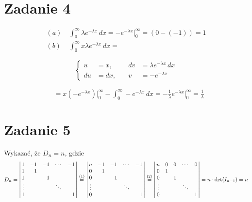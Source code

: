 \documentclass[11pt]{article}
\begin{document}
\section*{Zadanie 4}
\begin{align*}
(a)\;& \int_{0}^{\infty}\lambda e^{-\lambda x}\,dx= -e^{-\lambda x}\Big|_{0}^{\infty}=(0-(-1))=1 \\
(b)\;& \int_{0}^{\infty}x \lambda e^{-\lambda x}\,dx=
\end{align*}

\[\left\{
\begin{aligned}
u &= x, \quad &dv& = \lambda e^{-\lambda x}\,dx\\
du &= dx, \quad &v& = -e^{-\lambda x}
\end{aligned}
\right.\]

\begin{align*}
&= x (-e^{-\lambda x})\Big|_{0}^{\infty}-\int_{0}^{\infty} -e^{-\lambda x}\,dx=-\frac{1}{\lambda}e^{-\lambda x}\Big|_{0}^{\infty}=\frac{1}{\lambda}
\end{align*}

\section*{Zadanie 5}
Wykazać, że $D_n = n$, gdzie
\[
  D_n = 
\left|\,
\begin{matrix}
1      & -1 & -1 & \cdots & -1 \\
1      & \phantom{-}1 &    &        &    \\
1      &    &  \phantom{-}1 &        &    \\
\vdots &    &    & \ddots &    \\
1      &    &    &        & \phantom{-}1
\end{matrix}
\,\right| \overset{\text(1)}{=} 
\left|\,
\begin{matrix}
n      & -1 & -1 & \cdots & -1 \\
0      & \phantom{-}1 &    &        &    \\
0      &    &  \phantom{-}1 &        &    \\
\vdots &    &    & \ddots &    \\
0      &    &    &        & \phantom{-}1
\end{matrix}
\,\right| \overset{\text(2)}{=} 
\left|\,
\begin{matrix}
n      & 0 & 0 & \cdots & 0 \\
0      & 1 &   &        &    \\
0      &   & 1 &        &    \\
\vdots &   &   & \ddots &    \\
0      &   &   &        & 1
\end{matrix}
\,\right| = n \cdot \det(I_{n-1}) = n
\]
\end{document}
